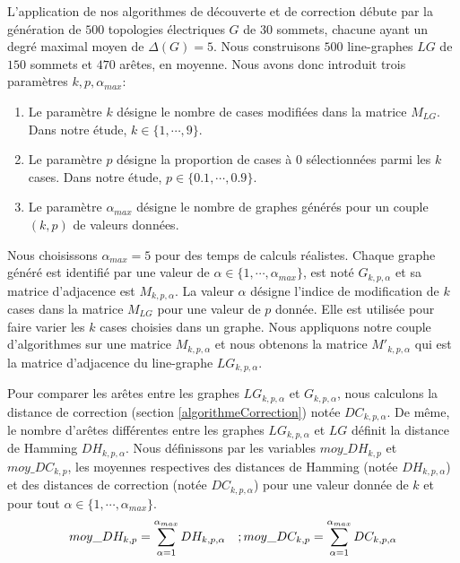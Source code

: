 L'application de nos algorithmes de d\'ecouverte et de correction d\'ebute par la g\'en\'eration de $500$ topologies \'electriques $G$ de $30$ sommets, chacune ayant un degr\'e maximal moyen de  $\Delta(G) = 5$.
Nous construisons $500$ line-graphes $LG$ de $150$ sommets et $470$ ar\^etes, en moyenne. \newline
Nous avons donc introduit trois param\`etres $k, p,  \alpha_{max}$:
\begin{enumerate}
\item Le param\`etre $k$ d\'esigne le nombre de cases modifi\'ees dans la matrice $M_{LG}$. Dans notre \'etude, $k \in \{1,\cdots,9\}$.
\item Le param\`etre $p$ d\'esigne la proportion de cases \`a $0$ s\'electionn\'ees parmi les $k$ cases. Dans notre \'etude, $p \in \{0.1,\cdots,0.9\}$.
\item Le param\`etre $\alpha_{max}$ d\'esigne le nombre de graphes g\'en\'er\'es pour un couple  $(k, p)$ de valeurs donn\'ees.
\end{enumerate}
 
Nous  choisissons $\alpha_{max} = 5$ pour des temps de calculs r\'ealistes. 
Chaque graphe g\'en\'er\'e est identifi\'e par une valeur de  $\alpha \in \{1,\cdots, \alpha_{max} \}$, est not\'e $G_{k,p,\alpha}$ et sa matrice d'adjacence est  $M_{k,p,\alpha}$. 
La valeur $\alpha$ d\'esigne l'indice de modification de $k$ cases dans la  matrice $M_{LG}$ pour une valeur de $p$ donn\'ee. Elle est utilis\'ee pour faire varier les $k$ cases choisies dans un graphe. 
Nous appliquons notre couple d'algorithmes sur une matrice $M_{k,p,\alpha}$ et nous obtenons la matrice $M'_{k,p,\alpha}$ qui est la matrice d'adjacence du line-graphe $LG_{k, p, \alpha}$. 

Pour comparer les ar\^etes entre les graphes $LG_{k,p, \alpha}$ et $G_{k,p, \alpha}$, nous calculons la distance de correction (section \ref{algorithmeCorrection}) not\'ee $DC_{k,p, \alpha}$.
De m\^eme, le nombre d'ar\^etes diff\'erentes entre les graphes $LG_{k,p, \alpha}$ et $LG$ d\'efinit la distance de Hamming $DH_{k,p, \alpha}$.
Nous d\'efinissons par les variables $moy\_DH_{k,p}$ et $moy\_DC_{k,p}$, les moyennes respectives des distances de Hamming (not\'ee $DH_{k,p,\alpha}$) et des distances de correction (not\'ee $DC_{k,p,\alpha}$) pour une valeur donn\'ee de $k$ et pour tout $\alpha \in \{1, \cdots, \alpha_{max}\}$.
\begin{equation}
moy\_DH_{k, p} = \sum_{\alpha = 1}^{ \alpha_{max} } DH_{k, p, \alpha} \hspace{1 em}; 
moy\_DC_{k, p} = \sum_{\alpha = 1}^{ \alpha_{max} } DC_{k, p, \alpha}
\end{equation}

